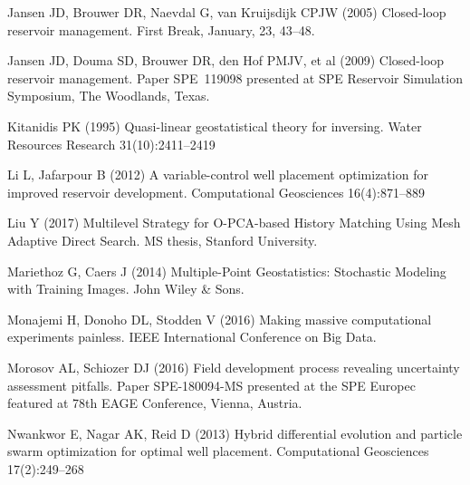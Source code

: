 \documentclass[11pt]{article}
\begin{document}
\begin{thebibliography}{51}
Jansen JD, Brouwer DR, Naevdal G, van Kruijsdijk CPJW (2005) Closed-loop
  reservoir management. First Break, January, 23, 43–48.

Jansen JD, Douma SD, Brouwer DR, {d}en Hof PMJV, et al (2009) Closed-loop
  reservoir management. Paper {SPE}~119098 presented at SPE Reservoir Simulation
  Symposium, The Woodlands, Texas.

Kitanidis PK (1995) Quasi-linear geostatistical theory for inversing. Water
  Resources Research 31(10):2411--2419

Li L, Jafarpour B (2012) A variable-control well placement optimization for
  improved reservoir development. Computational Geosciences 16(4):871--889

Liu Y (2017) Multilevel Strategy for O-PCA-based History Matching Using Mesh Adaptive Direct Search. MS thesis, Stanford University.

Mariethoz G, Caers J (2014) Multiple-Point Geostatistics: Stochastic Modeling with Training Images. John Wiley \& Sons.

Monajemi  H, Donoho DL, Stodden V (2016)
Making massive computational experiments painless.
IEEE International Conference on Big Data.

Morosov AL, Schiozer DJ (2016)
Field development process revealing uncertainty assessment pitfalls.
Paper SPE-180094-MS presented at the SPE Europec featured at 78th EAGE Conference, Vienna, Austria.




Nwankwor E, Nagar AK, Reid D (2013) Hybrid differential evolution and particle
  swarm optimization for optimal well placement. Computational Geosciences
  17(2):249--268


\end{thebibliography}
\end{document}
